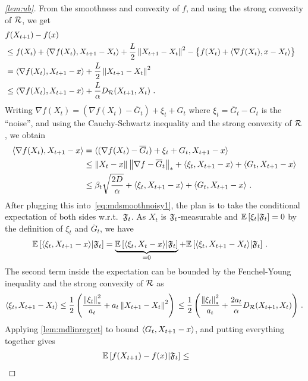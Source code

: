 \begin{proof}[\cref{lem:ub}]
From the smoothness and convexity of $f$, and using the strong convexity of $\mathcal{R}$, we get
\begin{align}
\lefteqn{f(X_{t+1}) - f(x)  } \nonumber \\
& \le  f(X_t) + \ip{\nabla f(X_t), X_{t+1}-X_t} + \frac{L}{2} \norm{X_{t+1}-X_t}^2 - \big\{f(X_t) + \ip{\nabla f(X_t) , x- X_t} \big\}  \nonumber \\
& = \ip{\nabla f(X_t), X_{t+1}-x} + \frac{L}{2}\norm{ X_{t+1} - X_t}^2 \nonumber \\
& \le \ip{\nabla f(X_t), X_{t+1}-x} + \frac{L}{\alpha} D_{\cR}(X_{t+1},X_t)~. \label{eq:mdsmoothnoisy1}
\end{align}
Writing
$\nabla f (X_t) = (\nabla f(X_t)-\overline G_t)  + \xi_t + G_t$ where $\xi_t = \overline G_t - G_t$ is the ``noise'', and using the Cauchy-Schwartz inequality
and the strong convexity of $\mathcal{R}$,
we obtain
\begin{align*}
\langle \nabla f(X_{t}),X_{t+1}-x \rangle
 &= \langle (\nabla f(X_t)-\overline G_t)  + \xi_t + G_t,X_{t+1}-x \rangle  \nonumber \\
 & \le \left\|X_t-x\right\|\left\|\nabla f-\overline G_t\right\|_* + \langle \xi_t,X_{t+1}-x \rangle + \langle  G_t, X_{t+1} - x  \rangle \nonumber \\
&\le \beta_t \sqrt{ \frac{2D}{\alpha} } + \langle \xi_t,X_{t+1}-x \rangle + \langle  G_t, X_{t+1} - x  \rangle~.
\end{align*}
After plugging this into~\eqref{eq:mdsmoothnoisy1},
the plan is to take the conditional expectation of both sides w.r.t.\  $\mathfrak{F}_{t}$.
As $X_t$ is $\mathfrak{F}_{t}$-measurable and $\mathbb{E}\left[ \xi_t|\mathfrak{F}_{t}\right] = 0$ by the definition of $\xi_t$ and $\overline G_t$,
we have
\begin{align*}
\MoveEqLeft
\EE{\ip{\xi_t, X_{t+1}-x}|\cS_{t}} = \underbrace{\EE{\ip{\xi_t,X_{t}-x}|\cS_{t}}}_{=0} + \EE{\ip{\xi_t,X_{t+1}-X_t}|\cS_{t}} \,.
\end{align*}
The second term inside the expectation can be bounded by the Fenchel-Young inequality and the strong convexity of $\mathcal{R}$ as
\[
\langle \xi_t,X_{t+1}-X_t \rangle \le \frac12 \left(\frac{\left\|\xi_t\right\|_*^2}{a_t} + a_t \left\|X_{t+1}-X_t\right\|^2\right)\,
\le \frac12 \left(\frac{\left\|\xi_t\right\|_*^2}{a_t} + \frac{2a_t}{\alpha} D_{\mathcal{R}}(X_{t+1},X_t) \right)\,.
\]
Applying
\cref{lem:mdlinregret}
to bound $\langle  G_t, X_{t+1} - x  \rangle$, and putting everything together gives
\begin{align*}
 \EE{f(X_{t+1}) - f(x) |\cS_{t} }
\le & \quad

\end{align*}
\end{proof}
